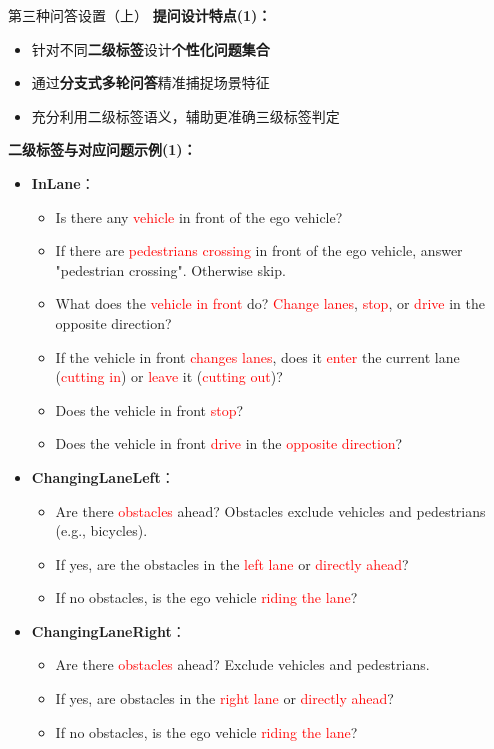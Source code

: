 \documentclass[serif]{beamer}
\begin{document}
\begin{frame}{第三种问答设置（上）}
\scriptsize
\textbf{提问设计特点(1)：}
\begin{itemize}
  \item 针对不同\textbf{二级标签}设计\textbf{个性化问题集合}
  \item 通过\textbf{分支式多轮问答}精准捕捉场景特征
  \item 充分利用二级标签语义，辅助更准确三级标签判定
\end{itemize}

\vspace{0.3em}
\textbf{二级标签与对应问题示例(1)：}

\begin{itemize}
  \item \textbf{InLane}：
  \begin{itemize}
    \item Is there any \textcolor{red}{vehicle} in front of the ego vehicle?
    \item If there are \textcolor{red}{pedestrians crossing} in front of the ego vehicle, answer "pedestrian crossing". Otherwise skip.
    \item What does the \textcolor{red}{vehicle in front} do? \textcolor{red}{Change lanes}, \textcolor{red}{stop}, or \textcolor{red}{drive} in the opposite direction?
    \item If the vehicle in front \textcolor{red}{changes lanes}, does it \textcolor{red}{enter} the current lane (\textcolor{red}{cutting in}) or \textcolor{red}{leave} it (\textcolor{red}{cutting out})?
    \item Does the vehicle in front \textcolor{red}{stop}?
    \item Does the vehicle in front \textcolor{red}{drive} in the \textcolor{red}{opposite direction}?
  \end{itemize}
  
  \item \textbf{ChangingLaneLeft}：
  \begin{itemize}
    \item Are there \textcolor{red}{obstacles} ahead? Obstacles exclude vehicles and pedestrians (e.g., bicycles).
    \item If yes, are the obstacles in the \textcolor{red}{left lane} or \textcolor{red}{directly ahead}?
    \item If no obstacles, is the ego vehicle \textcolor{red}{riding the lane}?
  \end{itemize}

  \item \textbf{ChangingLaneRight}：
  \begin{itemize}
    \item Are there \textcolor{red}{obstacles} ahead? Exclude vehicles and pedestrians.
    \item If yes, are obstacles in the \textcolor{red}{right lane} or \textcolor{red}{directly ahead}?
    \item If no obstacles, is the ego vehicle \textcolor{red}{riding the lane}?
  \end{itemize}
\end{itemize}
\normalsize
\end{frame}
\end{document}
